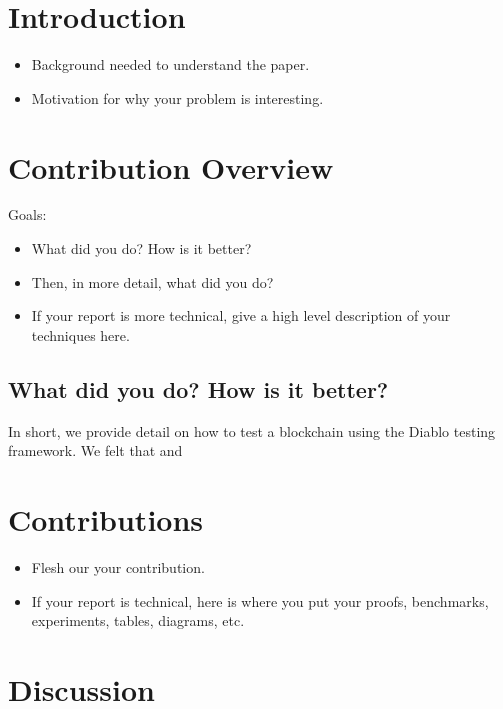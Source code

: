 \documentclass[letterpaper,12pt]{article}
\begin{document}
\pagestyle{fancy}

\section{Introduction}

\begin{itemize}
  \item Background needed to understand the paper.
  \item Motivation for why your problem is interesting.
\end{itemize}

\section{Contribution Overview}

Goals:
\begin{itemize}
  \item What did you do? How is it better?
  \item Then, in more detail, what did you do?
  \item If your report is more technical, give a high level description of your techniques here.
\end{itemize}

\subsection{What did you do? How is it better?}

In short, we provide detail on how to test a blockchain using the Diablo testing framework. We felt that \cite{Natoli2021} and \cite{Gramoli2023}


\section{Contributions}

\begin{itemize}
  \item Flesh our your contribution.
  \item If your report is technical, here is where you put your proofs, benchmarks, experiments, tables, diagrams, etc.
\end{itemize}

\section{Discussion}
\end{document}
